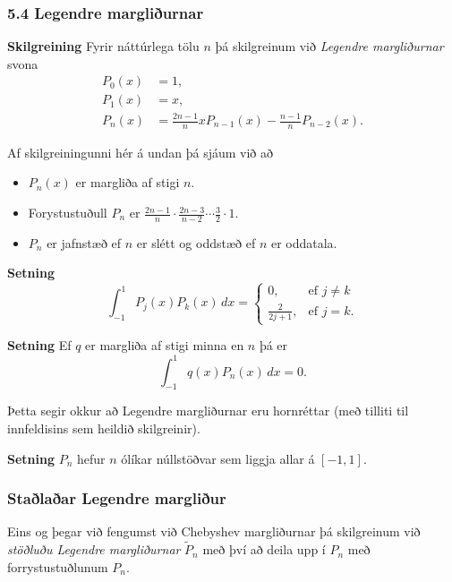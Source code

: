 \documentclass[icelandic,a4paper,12pt]{article}
\begin{document}
 

\subsubsection{5.4 Legendre margliðurnar}
 \textbf{Skilgreining}
  Fyrir náttúrlega tölu $n$ þá skilgreinum við \emph{Legendre margliðurnar} svona
  \begin{align*}
   P_0(x) &= 1,\\
   P_1(x) &= x,\\
   P_n(x) &= \frac{2n-1}n x P_{n-1}(x) - \frac{n-1}n P_{n-2}(x).
  \end{align*}

 \pause
 
 Af skilgreiningunni hér á undan þá sjáum við að \pause
  \begin{itemize}
   \item $P_n(x)$ er margliða af stigi $n$.\pause
   \item Forystustuðull $P_n$ er $\frac {2n-1}n \cdot \frac {2n-3}{n-2} \cdots \frac 32 \cdot 1$.\pause
   \item $P_n$ er jafnstæð ef $n$ er slétt og oddstæð ef $n$ er oddatala.
  \end{itemize}

 


 \textbf{Setning}
  $$
    \int_{-1}^1 P_j(x) P_k(x)\, dx =
    \begin{cases}
     0, & \text{ef } j\neq k\\
     \frac{2}{2j+1}, & \text{ef } j=k.
    \end{cases}
  $$
 
 \pause
 \textbf{Setning}
  Ef $q$ er margliða af stigi minna en $n$ þá er 
  $$
   \int_{-1}^1 q(x)P_n(x)\, dx = 0.
  $$
 
\pause
 Þetta segir okkur að Legendre margliðurnar eru hornréttar (með tilliti til innfeldisins sem
 heildið skilgreinir).
 
 \textbf{Setning}
  $P_n$ hefur $n$ ólíkar núllstöðvar sem liggja allar á $[-1,1]$.
 
  

\subsubsection{Staðlaðar Legendre margliður}
 Eins og þegar við fengumst við Chebyshev margliðurnar þá skilgreinum við 
 \emph{stöðluðu Legendre margliðurnar} $\tilde P_n$ með því að deila upp í $P_n$ með forrystustuðlunum
 $P_n$.
 
\end{document}
